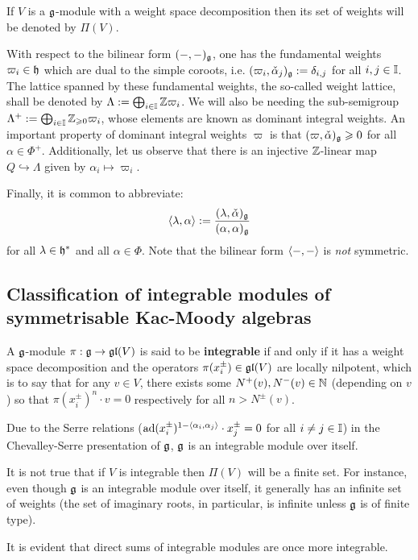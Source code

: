         If $V$ is a $\mathfrak{g}$-module with a weight space decomposition then its set of weights will be denoted by $\Pi(V)$.

        With respect to the bilinear form $(-, -)_{\mathfrak{g}}$, one has the fundamental weights $\varpi_i \in \mathfrak{h}$ which are dual to the simple coroots, i.e. $(\varpi_i, \check{\alpha}_j)_{\mathfrak{g}} := \delta_{i, j}$ for all $i, j \in \mathbb{I}$. The lattice spanned by these fundamental weights, the so-called weight lattice, shall be denoted by $\Lambda := \bigoplus_{i \in \mathbb{I}} \mathbb{Z} \varpi_i$. We will also be needing the sub-semigroup $\Lambda^+ := \bigoplus_{i \in \mathbb{I}} \mathbb{Z}_{\geqslant 0} \varpi_i$, whose elements are known as dominant integral weights. An important property of dominant integral weights $\varpi$ is that $(\varpi, \check{\alpha})_{\mathfrak{g}} \geqslant 0$ for all $\alpha \in \Phi^+$. Additionally, let us observe that there is an injective $\mathbb{Z}$-linear map $Q \hookrightarrow \Lambda$ given by $\alpha_i \mapsto \varpi_i$.

        Finally, it is common to abbreviate:
            $$\langle\lambda, \alpha\rangle := \frac{(\lambda, \check{\alpha})_{\mathfrak{g}}}{(\alpha, \alpha)_{\mathfrak{g}}}$$
        for all $\lambda \in \mathfrak{h}^*$ and all $\alpha \in \Phi$. Note that the bilinear form $\langle-, -\rangle$ is \textit{not} symmetric.

    \subsection{Classification of integrable modules of symmetrisable Kac-Moody algebras}
        \begin{definition} \label{def: integrable_modules}
            A $\mathfrak{g}$-module $\pi: \mathfrak{g} \to \mathfrak{gl}(V)$ is said to be \textbf{integrable} if and only if it has a weight space decomposition and the operators $\pi(x_i^{\pm}) \in \mathfrak{gl}(V)$ are locally nilpotent, which is to say that for any $v \in V$, there exists some $N^+(v), N^-(v) \in \mathbb{N}$ (depending on $v$) so that $\pi(x_i^{\pm})^n \cdot v = 0$ respectively for all $n > N^{\pm}(v)$.
        \end{definition}
        \begin{example}
            Due to the Serre relations ($\mathrm{ad}(x_i^{\pm})^{1 - \langle\alpha_i, \alpha_j\rangle} \cdot x_j^{\pm} = 0$ for all $i \not = j \in \mathbb{I}$) in the Chevalley-Serre presentation of $\mathfrak{g}$, $\mathfrak{g}$ is an integrable module over itself. 
        \end{example}
        \begin{remark}
            It is not true that if $V$ is integrable then $\Pi(V)$ will be a finite set. For instance, even though $\mathfrak{g}$ is an integrable module over itself, it generally has an infinite set of weights (the set of imaginary roots, in particular, is infinite unless $\mathfrak{g}$ is of finite type).
        \end{remark}
        \begin{remark}
            It is evident that direct sums of integrable modules are once more integrable.
        \end{remark}

